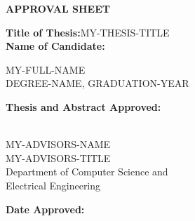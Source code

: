 \newpage
\begin{titlepage}
\vspace{0.6in}
\begin{singlespace}

\begin{center}
\vspace{0.1in}
\large{\bf APPROVAL SHEET}
\bigskip \bigskip
\end{center}

\begin{flushleft}
{\bf Title of Thesis:}{\hspace{3mm}}MY-THESIS-TITLE\\
\vspace{0.5in}
{\bf Name of Candidate:}{\hspace{3mm}} \parbox[t]{2in}{MY-FULL-NAME \\ DEGREE-NAME, GRADUATION-YEAR}
\end{flushleft}

\vspace{0.5in}

\begin{flushleft}
{\bf Thesis and Abstract Approved:}{\hspace{3mm}}
\parbox[t]{2.5in}{\underline{\hspace{2.0in}}\\
	MY-ADVISORS-NAME\\
	MY-ADVISORS-TITLE \\
	Department of Computer Science and \\
	Electrical Engineering}
\end{flushleft}

\vspace{0.8in}

\begin{flushleft}
{\bf Date Approved:}{\hspace{3mm}} \underline{\hspace{2.5in}}\\
\end{flushleft}

\end{singlespace}
\end{titlepage}
\par\vfil
